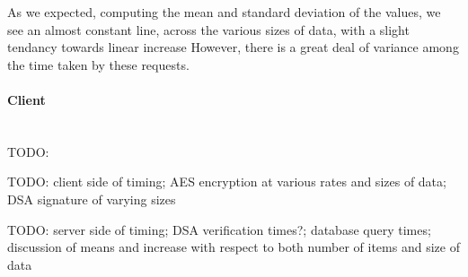 
As we expected, computing the mean and standard deviation of the values, we see an almost constant line, across the various sizes of data, with a slight tendancy towards linear increase
However, there is a great deal of variance among the time taken by these requests.

\paragraph{Client} ~\\
TODO:

TODO: client side of timing; AES encryption at various rates and sizes of data; DSA signature of varying sizes

TODO: server side of timing; DSA verification times?; database query times; discussion of means and increase with respect to both number of items and size of data
